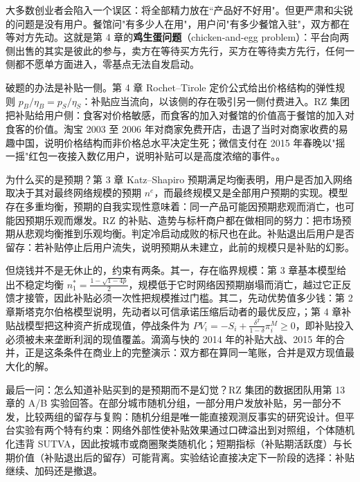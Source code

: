 大多数创业者会陷入一个误区：将全部精力放在“产品好不好用"。但更严肃和尖锐的问题是没有用户。餐馆问"有多少人在用"，用户问"有多少餐馆入驻"，双方都在等对方先动。这就是第 4 章的\textbf{鸡生蛋问题}（chicken-and-egg problem）：平台向两侧出售的其实是彼此的参与，卖方在等待买方先行，买方在等待卖方先行，任何一侧都不愿单方面进入，零基点无法自发启动。

破题的办法是补贴一侧。第 4 章 Rochet--Tirole 定价公式给出价格结构的弹性规则 $p_B/\eta_B=p_S/\eta_S$：补贴应当流向，以该侧的存在吸引另一侧付费进入。RZ 集团把补贴给用户侧：食客对价格敏感，而食客的加入对餐馆的价值高于餐馆的加入对食客的价值。淘宝 2003 至 2006 年对商家免费开店，击退了当时对商家收费的易趣中国，说明价格结构而非价格总水平决定生死；微信支付在 2015 年春晚以"摇一摇"红包一夜接入数亿用户，说明补贴可以是高度浓缩的事件。。

为什么买的是预期？第 3 章 Katz--Shapiro 预期满足均衡表明，用户是否加入网络取决于其对最终网络规模的预期 $n^{e}$，而最终规模又是全部用户预期的实现。模型存在多重均衡，预期的自我实现性意味着：同一产品可能因预期悲观而消亡，也可能因预期乐观而爆发。RZ 的补贴、造势与标杆商户都在做相同的努力：把市场预期从悲观均衡推到乐观均衡。判定冷启动成败的标尺也在此。补贴退出后用户是否留存：若补贴停止后用户流失，说明预期从未建立，此前的规模只是补贴的幻影。

但烧钱并不是无休止的，约束有两条。其一，存在临界规模：第 3 章基本模型给出不稳定均衡 $n_1^{*}=\frac{1-\sqrt{1-4p}}{2}$，规模低于它时网络因预期崩塌而消亡，越过它正反馈才接管，因此补贴必须一次性把规模推过门槛。其二，先动优势值多少钱：第 2 章斯塔克尔伯格模型说明，先动者以可信承诺压缩后动者的最优反应，；第 4 章补贴战模型把这种资产折成现值，停战条件为 $PV_i=-S_i+\frac{\delta^T}{1-\delta}\pi_i^M\geq 0$，即补贴投入必须被未来垄断利润的现值覆盖。滴滴与快的 2014 年的补贴大战、2015 年的合并，正是这条条件在商业上的完整演示：双方都在算同一笔账，合并是双方现值最大化的解。

最后一问：怎么知道补贴买到的是预期而不是幻觉？RZ 集团的数据团队用第 13 章的 A/B 实验回答。在部分城市随机分组，一部分用户发放补贴，另一部分不发，比较两组的留存与复购：随机分组是唯一能直接观测反事实的研究设计。但平台实验有两个特有约束：网络外部性使补贴效果通过口碑溢出到对照组，个体随机化违背 SUTVA，因此按城市或商圈聚类随机化；短期指标（补贴期活跃度）与长期价值（补贴退出后的留存）可能背离。实验结论直接决定下一阶段的选择：补贴继续、加码还是撤退。

